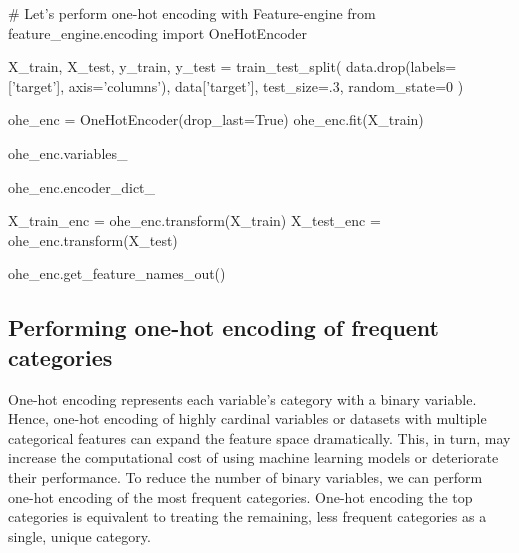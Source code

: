 \begin{pyc}
# Let's perform one-hot encoding with Feature-engine
from feature_engine.encoding import OneHotEncoder

X_train, X_test, y_train, y_test = train_test_split(
    data.drop(labels=['target'], axis='columns'), data['target'],
    test_size=.3,
    random_state=0
)

ohe_enc = OneHotEncoder(drop_last=True)
ohe_enc.fit(X_train)

ohe_enc.variables_

ohe_enc.encoder_dict_

X_train_enc = ohe_enc.transform(X_train)
X_test_enc = ohe_enc.transform(X_test)

ohe_enc.get_feature_names_out()
\end{pyc}

\subsection{Performing one-hot encoding of frequent categories}
One-hot encoding represents each variable’s category with a binary variable. Hence, one-hot encoding of highly cardinal variables or datasets with multiple categorical features can expand the feature space dramatically. This, in turn, may increase the computational cost of using machine learning models or deteriorate their performance. To reduce the number of binary variables, we can perform one-hot encoding of the most frequent categories. One-hot encoding the top categories is equivalent to treating the remaining, less frequent categories as a single, unique category.